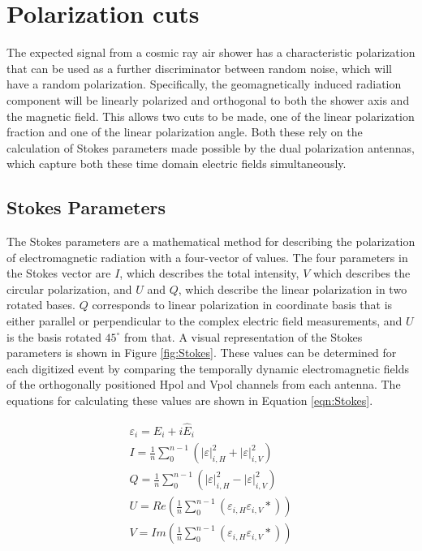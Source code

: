\section{Polarization cuts}%
	The expected signal from a cosmic ray air shower has a characteristic polarization that can be used as a further discriminator between random noise, which will have a random polarization.  Specifically, the geomagnetically induced radiation component will be linearly polarized and orthogonal to both the shower axis and the magnetic field.  This allows two cuts to be made, one of the linear polarization fraction and one of the linear polarization angle.  Both these rely on the calculation of Stokes parameters made possible by the dual polarization antennas, which capture both these time domain electric fields simultaneously.

	\subsection{Stokes Parameters}
		The Stokes parameters are a mathematical method for describing the polarization of electromagnetic radiation with a four-vector of values.  The four parameters in the Stokes vector are $I$, which describes the total intensity, $V$ which describes the circular polarization, and $U$ and $Q$, which describe the linear polarization in two rotated bases.  $Q$ corresponds to linear polarization in coordinate basis that is either parallel or perpendicular to the complex electric field measurements, and $U$ is the basis rotated $45^{\circ}$ from that.  A visual representation of the Stokes parameters is shown in Figure \ref{fig:Stokes}.  These values can be determined for each digitized event by comparing the temporally dynamic electromagnetic fields of the orthogonally positioned Hpol and Vpol channels from each antenna.  The equations for calculating these values are shown in Equation \ref{eqn:Stokes}.
		
	\begin{gather*}
	\varepsilon_{i} = E_{i} + i\hat{E}_{i} \\
	I =	\frac{1}{n}\sum^{n-1}_{0}(|\varepsilon|^{2}_{i,H} + |\varepsilon|^{2}_{i,V}) \\
	Q =	\frac{1}{n}\sum^{n-1}_{0}(|\varepsilon|^{2}_{i,H} - |\varepsilon|^{2}_{i,V}) \\
	U =	Re(\frac{1}{n}\sum^{n-1}_{0}(\varepsilon_{i,H} \varepsilon_{i,V}*)) \\
	V =	Im(\frac{1}{n}\sum^{n-1}_{0}(\varepsilon_{i,H} \varepsilon_{i,V}*)) \\
	\label{eqn:Stokes}
	\end{gather*}

